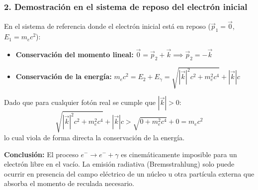 \begin{problema}
\subsubsection*{2. Demostración en el sistema de reposo del electrón inicial}

En el sistema de referencia donde el electrón inicial está en reposo ($\vec{p}_1 = \vec{0}$, $E_1 = m_e c^2$):
\begin{itemize}
    \item \textbf{Conservación del momento lineal:} $\vec{0} = \vec{p}_2 + \vec{k} \implies \vec{p}_2 = -\vec{k}$
    \item \textbf{Conservación de la energía:} $m_e c^2 = E_2 + E_\gamma = \sqrt{|\vec{k}|^2 c^2 + m_e^2 c^4} + |\vec{k}| c$
\end{itemize}

Dado que para cualquier fotón real se cumple que $|\vec{k}| > 0$:
\[
\sqrt{|\vec{k}|^2 c^2 + m_e^2 c^4} + |\vec{k}| c > \sqrt{0 + m_e^2 c^4} + 0 = m_e c^2
\]
lo cual viola de forma directa la conservación de la energía.

\textbf{Conclusión:} El proceso $e^- \rightarrow e^- + \gamma$ es cinemáticamente imposible para un electrón libre en el vacío. La emisión radiativa (Bremsstrahlung) solo puede ocurrir en presencia del campo eléctrico de un núcleo u otra partícula externa que absorba el momento de reculada necesario.
\end{problema}
\newpage
